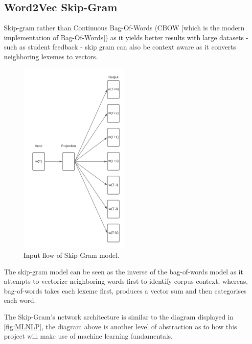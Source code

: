 \subsection{Word2Vec Skip-Gram}

Skip-gram rather than Continuous Bag-Of-Words (CBOW [which is the modern implementation of Bag-Of-Words]) as it yields better results with large datasets - such as student feedback - skip gram can also be context aware as it converts neighboring lexemes to vectors.

\begin{figure}[H]
    \centering
    \includegraphics[width=0.49\textwidth]{figures/chapter-5/SkipGramModel.pdf}
    \caption[SkipGramModel]{Input flow of Skip-Gram model.
    \label{fig:SkipGramModel}}
\end{figure}

The skip-gram model can be seen as the inverse of the bag-of-words model as it attempts to vectorize neighboring words first to identify corpus context, whereas, bag-of-words takes each lexeme first, produces a vector sum and then categorises each word. \newpage

The Skip-Gram's network architecture is similar to the diagram displayed in \autoref{fig:MLNLP}, the diagram above is another level of abstraction as to how this project will make use of machine learning fundamentals.


